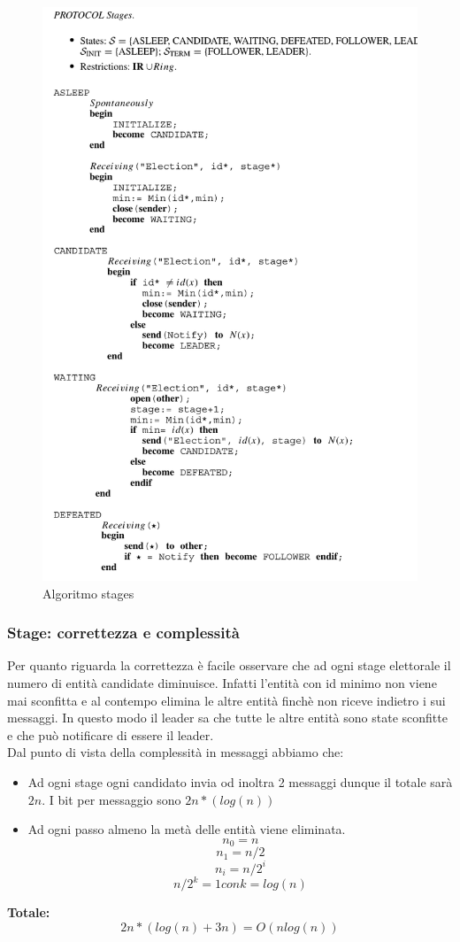 \documentclass[12pt]{article}
\begin{document}
			\begin{figure}[h!]
				\centering
				\includegraphics[scale=0.50]{img/stages.png}
				\caption{Algoritmo stages}
			\end{figure}
		
		\subsubsection{Stage: correttezza e complessità}	
			Per quanto riguarda la correttezza è facile osservare che ad ogni stage elettorale il numero di entità candidate diminuisce. Infatti l'entità con id minimo non viene mai sconfitta e al contempo elimina le altre entità finchè non riceve indietro i sui messaggi. In questo modo il leader sa che tutte le altre entità sono state sconfitte e che può notificare di essere il leader.\\
			Dal punto di vista della complessità in messaggi abbiamo che:
			\begin{itemize}
				\item Ad ogni stage ogni candidato invia od inoltra 2 messaggi dunque il totale sarà  $2n$.  I bit per messaggio sono $2n*(log(n))$
				\item Ad ogni passo almeno la metà delle entità viene eliminata.
				 $$n_0 = n$$
				 $$n_1 = n/2$$
				 $$n_i = n/2^i $$
				 $$n/2^k = 1 conk=log(n) $$
			\end{itemize}
			\textbf{Totale:}
			$$2n*(log(n)+3n) = O(nlog(n)) $$
			
\end{document}
